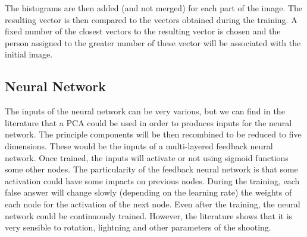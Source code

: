 The histograms are then added (and not merged) for each part of the image. The resulting vector is then compared to the vectors obtained during the training. A fixed number of the closest vectors to the resulting vector is chosen and the person assigned to the greater number of these vector will be associated with the initial image.

\subsection{Neural Network}
The inputs of the neural network can be very various, but we can find in the literature that a PCA could be used in order to produces inputs for the neural network. The principle components will be then recombined to be reduced to five dimensions. These would be the inputs of a multi-layered feedback neural network. Once trained, the inputs will activate or not using sigmoid functions some other nodes. The particularity of the feedback neural network is that some activation could have some impacts on previous nodes.
During the training, each false answer  will change slowly (depending on the learning rate) the weights of each node for the activation of the next node. Even after the training, the neural network could be continuously trained. However, the literature shows that it is very sensible to rotation, lightning and other parameters of the shooting.
